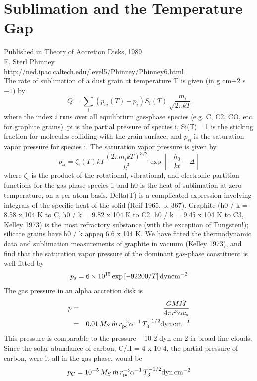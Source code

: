 \documentclass[11pt]{article}
\begin{document}
\section{Sublimation and the Temperature Gap}
Published in Theory of Accretion Disks, 1989 \\
E. Sterl Phinney\\
http://ned.ipac.caltech.edu/level5/Phinney/Phinney6.html\\

The rate of sublimation of a dust grain at temperature T is given (in g cm$-2$ s$-1$) by 
\begin{equation}
  Q = \sum_{i} (p_{si}(T)-p_{i})S_{i}(T)\sqrt\frac{m_{i}}{2\pi kT}
\end{equation} 
where the index $i$ runs over all equilibrium gas-phase species (e.g. C, C2, CO, etc. for graphite grains), pi is the partial pressure of species i, Si(T) ~ 1 is the sticking fraction for molecules colliding with the grain surface, and $p_{si}$ is the saturation vapor pressure for species i. The saturation vapor pressure is given by 
\begin{equation}
p_{si} = \zeta_{i}(T)kT\frac{(2\pi m_{i}kT)^{3/2}}{h^{3}}\exp \left[ -\frac{h_0}{kt}-\Delta\right]
\end{equation} 
where $\zeta_{i}$ is the product of the rotational, vibrational, and electronic partition functions for the gas-phase species i, and h0 is the heat of sublimation at zero temperature, on a per atom basis. Delta(T) is a complicated expression involving integrals of the specific heat of the solid (Reif 1965, p. 367). Graphite (h0 / k = 8.58 x 104 K to C, h0 / k = 9.82 x 104 K to C2, h0 / k = 9.45 x 104 K to C3, Kelley 1973) is the most refractory substance (with the exception of Tungsten!); silicate grains have h0 / k appeq 6.6 x 104 K. We have fitted the thermodynamic data and sublimation measurements of graphite in vacuum (Kelley 1973), and find that the saturation vapor pressure of the dominant gas-phase constituent is well fitted by 
\begin{equation}
p_{s} = 6\times10^{15} \exp \left[ -92200 / T \right] \rm{dyn} cm^{-2}
\end{equation} 
 The gas pressure in an alpha accretion disk is 
\begin{eqnarray}
p & = & \frac{GM\dot{M}}{4\pi r^{3} \alpha c_{s}} \\
  &  = & 0.01 \, M_{S}\,\dot{m}\,r^{-3}_{\rm{pc}}\alpha^{-1} \, T_{3}^{-1/2} \rm{dyn} \, cm^{-2}
\end{eqnarray} 
 This pressure is comparable to the pressure ~ 10-2 dyn cm-2 in broad-line clouds. Since the solar abundance of carbon, C/H = 4 x 10-4, the partial pressure of carbon, were it all in the gas phase, would be
\begin{equation}
p_{C}  = 10^{-5} \, M_{S}\,\dot{m}\,r^{-3}_{\rm{pc}}\alpha^{-1} \, T_{3}^{-1/2} \rm{dyn} \, cm^{-2}
\end{equation} 
\end{document}
